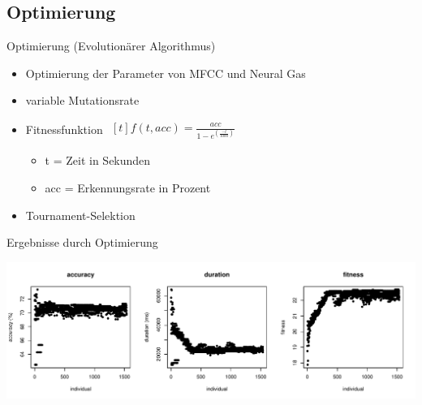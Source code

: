 \subsection{Optimierung}
\begin{frame}{Optimierung (Evolutionärer Algorithmus)}
	\begin{itemize}[<+->]
		\item Optimierung der Parameter von MFCC und Neural Gas
		\item variable Mutationsrate
		\item Fitnessfunktion $\begin{aligned}[t]f(t,acc) = \frac{acc}{1 - e^{\left(\frac{-t}{1000}\right)}}\end{aligned}$
		\begin{itemize}[<1->]
			\item t = Zeit in Sekunden
			\item acc = Erkennungsrate in Prozent
		\end{itemize}
		\item Tournament-Selektion
	\end{itemize}		
\end{frame}

\begin{frame}{Ergebnisse durch Optimierung}
	\begin{center}
		\hspace*{-8mm}
		\includegraphics[width=1.15\textwidth]{img/eaFitness}
	\end{center}
\end{frame}

